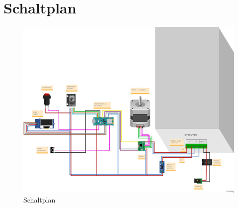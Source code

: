 \section{Schaltplan} \label{MLLS}
\begin{figure}[htb]
\begin{center}
	\includegraphics[width=\textwidth]{Images/Schaltplan1.png}
	\caption{Schaltplan} \label{Schaltplan}
\end{center}
\end{figure}
